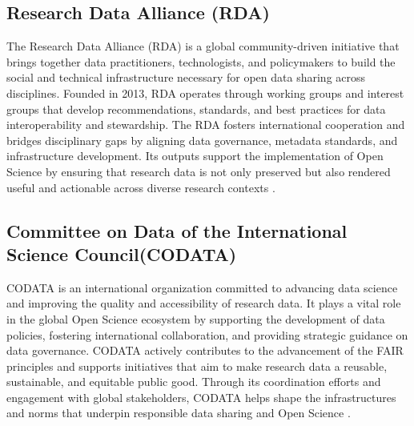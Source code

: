 \documentclass[final]{rc-book-2.14}
\begin{document}
\subsection{Research Data Alliance (RDA)}
The Research Data Alliance (RDA) is a global community-driven initiative that brings together data practitioners, technologists, and policymakers to build the social and technical infrastructure necessary for open data sharing across disciplines. Founded in 2013, RDA operates through working groups and interest groups that develop recommendations, standards, and best practices for data interoperability and stewardship. The RDA fosters international cooperation and bridges disciplinary gaps by aligning data governance, metadata standards, and infrastructure development. Its outputs support the implementation of Open Science by ensuring that research data is not only preserved but also rendered useful and actionable across diverse research contexts \cite{berman_research_2020}.

\subsection{Committee on Data of the International Science Council(CODATA)}
CODATA is an international organization committed to advancing data science and improving the quality and accessibility of research data. It plays a vital role in the global Open Science ecosystem by supporting the development of data policies, fostering international collaboration, and providing strategic guidance on data governance. CODATA actively contributes to the advancement of the FAIR principles and supports initiatives that aim to make research data a reusable, sustainable, and equitable public good. Through its coordination efforts and engagement with global stakeholders, CODATA helps shape the infrastructures and norms that underpin responsible data sharing and Open Science \cite{codata_2024}.
\end{document}
